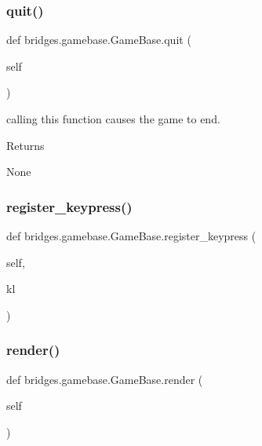 \subsubsection{\texorpdfstring{quit()}{quit()}}
{\footnotesize\ttfamily def bridges.\+gamebase.\+Game\+Base.\+quit (\begin{DoxyParamCaption}\item[{}]{self }\end{DoxyParamCaption})}



calling this function causes the game to end. 

\begin{DoxyReturn}{Returns}


None 
\end{DoxyReturn}
\mbox{\label{classbridges_1_1gamebase_1_1_game_base_ac60243e192a502fb7be51f86eb5b76b6}} 
\subsubsection{\texorpdfstring{register\+\_\+keypress()}{register\_keypress()}}
{\footnotesize\ttfamily def bridges.\+gamebase.\+Game\+Base.\+register\+\_\+keypress (\begin{DoxyParamCaption}\item[{}]{self,  }\item[{}]{kl }\end{DoxyParamCaption})}

\mbox{\label{classbridges_1_1gamebase_1_1_game_base_a3ae3bcb9702097029509d4123bc9276e}} 
\subsubsection{\texorpdfstring{render()}{render()}}
{\footnotesize\ttfamily def bridges.\+gamebase.\+Game\+Base.\+render (\begin{DoxyParamCaption}\item[{}]{self }\end{DoxyParamCaption})}



